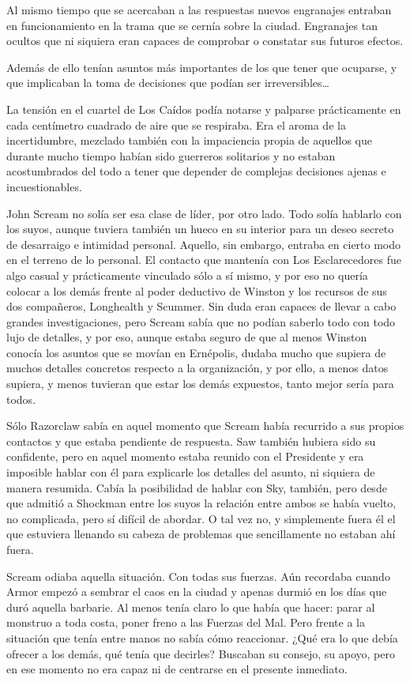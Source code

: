 Al mismo tiempo que se acercaban a las respuestas nuevos engranajes entraban en funcionamiento en la trama que se cernía sobre la ciudad. Engranajes tan ocultos que ni siquiera eran capaces de comprobar o constatar sus futuros efectos.

Además de ello tenían asuntos más importantes de los que tener que ocuparse, y que implicaban la toma de decisiones que podían ser irreversibles\dots

\fancyparbreak
La tensión en el cuartel de Los Caídos podía notarse y palparse prácticamente en cada centímetro cuadrado de aire que se respiraba. Era el aroma de la incertidumbre, mezclado también con la impaciencia propia de aquellos que durante mucho tiempo habían sido guerreros solitarios y no estaban acostumbrados del todo a tener que depender de complejas decisiones ajenas e incuestionables.

John Scream no solía ser esa clase de líder, por otro lado. Todo solía hablarlo con los suyos, aunque tuviera también un hueco en su interior para un deseo secreto de desarraigo e intimidad personal. Aquello, sin embargo, entraba en cierto modo en el terreno de lo personal. El contacto que mantenía con Los Esclarecedores fue algo casual y prácticamente vinculado sólo a sí mismo, y por eso no quería colocar a los demás frente al poder deductivo de Winston y los recursos de sus dos compañeros, Longhealth y Scummer. Sin duda eran capaces de llevar a cabo grandes investigaciones, pero Scream sabía que no podían saberlo todo con todo lujo de detalles, y por eso, aunque estaba seguro de que al menos Winston conocía los asuntos que se movían en Ernépolis, dudaba mucho que supiera de muchos detalles concretos respecto a la organización, y por ello, a menos datos supiera, y menos tuvieran que estar los demás expuestos, tanto mejor sería para todos.

Sólo Razorclaw sabía en aquel momento que Scream había recurrido a sus propios contactos y que estaba pendiente de respuesta. Saw también hubiera sido su confidente, pero en aquel momento estaba reunido con el Presidente y era imposible hablar con él para explicarle los detalles del asunto, ni siquiera de manera resumida. Cabía la posibilidad de hablar con Sky, también, pero desde que admitió a Shockman entre los suyos la relación entre ambos se había vuelto, no complicada, pero sí difícil de abordar. O tal vez no, y simplemente fuera él el que estuviera llenando su cabeza de problemas que sencillamente no estaban ahí fuera.

Scream odiaba aquella situación. Con todas sus fuerzas. Aún recordaba cuando Armor empezó a sembrar el caos en la ciudad y apenas durmió en los días que duró aquella barbarie. Al menos tenía claro lo que había que hacer: parar al monstruo a toda costa, poner freno a las Fuerzas del Mal. Pero frente a la situación que tenía entre manos no sabía cómo reaccionar. ¿Qué era lo que debía ofrecer a los demás, qué tenía que decirles? Buscaban su consejo, su apoyo, pero en ese momento no era capaz ni de centrarse en el presente inmediato.


